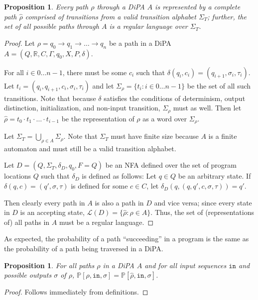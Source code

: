 \documentclass[12pt]{article}
\newcommand{\RR}{\mathbb{R}}
\newcommand{\PP}{\mathbb{P}}
\newtheorem{prop}[thm]{Proposition}
\theoremstyle{definition}
\begin{document}
\begin{prop}
    Every path $\rho$ through a DiPA $A$ is represented by a complete path $\hat{\rho}$ comprised of transitions from a valid transition alphabet $\Sigma_T$; further, the set of all possible paths through $A$ is a regular language over $\Sigma_T$.
\end{prop}
\begin{proof}
    Let $\rho = q_0\to q_1\to\ldots \to q_n$ be a path in a DiPA $A=(Q, \RR, C, \Gamma, q_0, X, P, \delta)$. 

    For all $i\in 0\ldots n-1$, there must be some $c_i$ such that $\delta(q_i, c_i) = (q_{i+1}, \sigma_i, \tau_i)$. Let $t_i = (q_i, q_{i+1}, c_i, \sigma_i, \tau_i)$ and let $\Sigma_\rho = \{t_i: i\in 0\ldots n-1\}$ be the set of all such transitions. Note that because $\delta$ satisfies the conditions of determinism, output distinction, initialization, and non-input transition, $\Sigma_\rho$ must as well. 
    Then let $\hat{\rho} = t_0\cdot t_1\cdot \ldots\cdot t_{i-1}$ be the representation of $\rho$ as a word over $\Sigma_\rho$. 

    Let $\Sigma_T = \bigcup_{\rho\in A}\Sigma_\rho$. Note that $\Sigma_T$ must have finite size because $A$ is a finite automaton and must still be a valid transition alphabet.

    Let $D = (Q, \Sigma_T, \delta_D, q_0, F=Q)$ be an NFA defined over the set of program locations $Q$ such that $\delta_D$ is defined as follows:
    Let $q\in Q$ be an arbitrary state. If $\delta(q, c) = (q', \sigma, \tau)$ is defined for some $c\in C$, let $\delta_D(q, (q, q', c, \sigma, \tau)) = q'$.

    Then clearly every path in $A$ is also a path in $D$ and vice versa; since every state in $D$ is an accepting state, $\mathcal{L}(D) = \{\hat{\rho}: \rho\in A\}$. Thus, the set of (representations of) all paths in $A$ must be a regular language. 
\end{proof}

As expected, the probability of a path ``succeeding'' in a program is the same as the probability of a path being traversed in a DiPA. 

\begin{prop}
    For all paths $\rho$ in a DiPA $A$ and for all input sequences $\texttt{in}$ and possible outputs $\sigma$ of $\rho$, $\PP[\rho, \texttt{in}, \sigma] = \PP[\hat{\rho}, \texttt{in}, \sigma]$.
\end{prop}
\begin{proof}
    Follows immediately from definitions. 
\end{proof}
\end{document}
